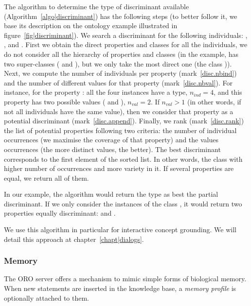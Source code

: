 The algorithm to determine the type of discriminant available
(Algorithm~\ref{algo|discriminant}) has the following steps (to better follow
it, we base its description on the ontology example illustrated in
figure~\ref{fig|discriminant}). We search a discriminant for the following
individuals: , ,  and
. First we obtain the direct properties and classes for all
the individuals, \ie we do not consider all the hierarchy of properties and
classes (in the example,  has two super-classes
( and ), but we only take the most direct one
(the class )). Next, we compute the number of individuals per
property (mark~\ref{disc.nbind}) and the number of different values for that
property (mark~\ref{disc.nbval}). For instance, for the property
: all the four instances have a type, $n_{ind} = 4$, and this
property has two possible values ( and ),
$n_{val} = 2$. If $n_{val} > 1$ (in other words, if not all individuals have
the same value), then we consider that property as a potential discriminant
(mark~\ref{disc.append}).  Finally, we rank (mark~\ref{disc.rank}) the list of
potential properties following two criteria: the number of individual
occurrences (\ie we maximise the coverage of that property) and the values
occurrences (\ie the more distinct values, the better).  The best discriminant
corresponds to the first element of the sorted list. In other words, the class
with higher number of occurrences and more variety in it.  If several
properties are equal, we return all of them.

In our example, the algorithm would return the type as best the partial
discriminant. If we only consider the instances of the class ,
it would return two properties equally discriminant:  and
.

We use this algorithm in particular for interactive concept grounding. We will
detail this approach at chapter~\ref{chapt|dialogs}.

\subsubsection{Memory}
\label{sect|oroserver-memory}

The ORO server offers a mechanism to mimic simple forms of biological memory.
When new statements are inserted in the knowledge base, a \emph{memory profile}
is optionally attached to them.

